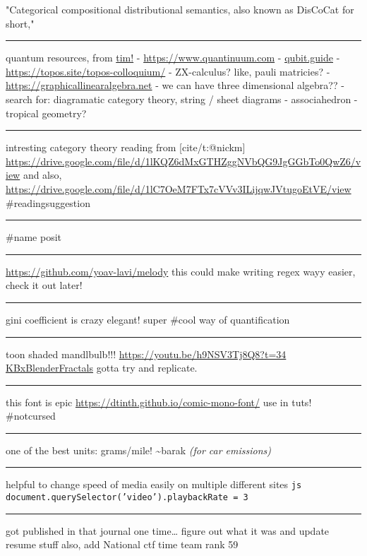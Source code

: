\documentclass[letterpaper]{article}
\begin{document}
"Categorical compositional distributional semantics, also known as
DisCoCat for short,"

\noindent\rule{\textwidth}{0.5pt}

quantum resources, from \href{https://thosgood.com}{tim!} -
\url{https://www.quantinuum.com} - \href{https://qubit.guide}{qubit.guide} -
\url{https://topos.site/topos-colloquium/} - ZX-calculus? like, pauli
matricies? - \url{https://graphicallinearalgebra.net} - we can have three
dimensional algebra?? - search for: diagramatic category theory, string
/ sheet diagrams - associahedron - tropical geometry?

\noindent\rule{\textwidth}{0.5pt}

intresting category theory reading from [cite/t:@nickm]
\url{https://drive.google.com/file/d/1lKQZ6dMxGTHZggNVbQG9JgGGbTo0QwZ6/view}
and also,
\url{https://drive.google.com/file/d/1lC7OeM7FTx7cVVv3ILijqwJVtugoEtVE/view}
\#readingsuggestion

\noindent\rule{\textwidth}{0.5pt}

\#name posit

\noindent\rule{\textwidth}{0.5pt}

\url{https://github.com/yoav-lavi/melody} this could make writing regex wayy
easier, check it out later!

\noindent\rule{\textwidth}{0.5pt}

gini coefficient is crazy elegant! super \#cool way of quantification

\noindent\rule{\textwidth}{0.5pt}

toon shaded mandlbulb!!! \url{https://youtu.be/h9NSV3Tj8Q8?t=34}
\href{KBxBlenderFractals.org}{KBxBlenderFractals} gotta try and
replicate.

\noindent\rule{\textwidth}{0.5pt}

this font is epic \url{https://dtinth.github.io/comic-mono-font/} use in tuts!
\#notcursed

\noindent\rule{\textwidth}{0.5pt}

one of the best units: grams/mile! \textasciitilde{}barak \emph{(for car emissions)}

\noindent\rule{\textwidth}{0.5pt}

helpful to change speed of media easily on multiple different sites
\texttt{js document.querySelector('video').playbackRate = 3}

\noindent\rule{\textwidth}{0.5pt}

got published in that journal one time\ldots{} figure out what it was and
update resume stuff also, add National ctf time team rank 59
\end{document}
